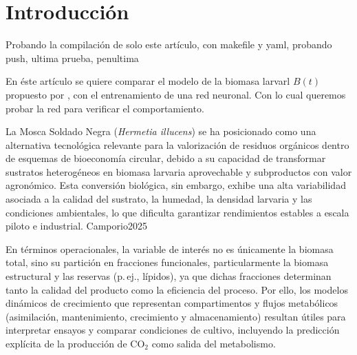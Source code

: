 \begin{abstract}
El monitoreo de la dinámica de crecimiento de la mosca soldado negra (\textit{Hermetia illucens}) es fundamental para la optimización de procesos de bioconversión a escala industrial. Sin embargo, el metabolismo larvario suele tratarse como una ``caja negra''. Este artículo presenta un enfoque computacional híbrido para estimar y predecir la producción de CO$_2$ y el crecimiento de la biomasa estructural. Se implementó una red neuronal multicapa (MLP) para estimar dinámicamente el parámetro de peso máximo ($B_{max}$), acoplada a métodos de integración numérica (Runge-Kutta de cuarto orden y Euler) para resolver el modelo metabólico hacia adelante.

\textbf{Palabras clave:} Hermetia illucens, bioconversión, redes neuronales, Runge-Kutta, modelado dinámico, CO$_2$.
\end{abstract}

\section{Introducción}

Probando la compilación de solo este artículo, con makefile y yaml, probando push, ultima prueba, penultima

En éste artículo se quiere comparar el modelo de la biomasa larvarl $B(t)$ 
propuesto por \parencite{eriksenDynamicModellingFeed2022}, con el entrenamiento de una red neuronal. Con lo cual queremos probar la red para verificar el comportamiento.

La Mosca Soldado Negra (\textit{Hermetia illucens}) se ha posicionado como una alternativa tecnológica relevante para la valorización de residuos orgánicos dentro de esquemas de bioeconomía circular, debido a su capacidad de transformar sustratos heterogéneos en biomasa larvaria aprovechable y subproductos con valor agronómico. \parencite{camperioWasteFunctionalFeed2025,goldBiowasteTreatmentBlack2020} \cite{goldEffectsRearingSystem2022} Esta conversión biológica, sin embargo, exhibe una alta variabilidad asociada a la calidad del sustrato, la humedad, la densidad larvaria y las condiciones ambientales, lo que dificulta garantizar rendimientos estables a escala piloto e industrial. \cite{eriksenDynamicModellingFeed2022} Camporio2025

En términos operacionales, la variable de interés no es únicamente la biomasa total, sino su partición en fracciones funcionales, particularmente la biomasa estructural y las reservas (p.\,ej., lípidos), ya que dichas fracciones determinan tanto la calidad del producto como la eficiencia del proceso. \cite{eriksenDynamicModellingFeed2022} Por ello, los modelos dinámicos de crecimiento que representan compartimentos y flujos metabólicos (asimilación, mantenimiento, crecimiento y almacenamiento) resultan útiles para interpretar ensayos y comparar condiciones de cultivo, incluyendo la predicción explícita de la producción de CO$_2$ como salida del metabolismo. \cite{eriksenDynamicModellingFeed2022}

